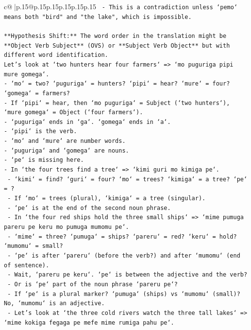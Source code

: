 \documentclass{article}
\begin{document}
{\begin{supertabular}{c@{$\;$}|p{.15\linewidth}@{}p{.15\linewidth}p{.15\linewidth}p{.15\linewidth}p{.15\linewidth}p{.15\linewidth}}
{{{\texttt{      {-} This is a contradiction unless `pemo` means both "bird" and "the lake", which is impossible.} \\
\\ 
\texttt{**Hypothesis Shift:** The word order in the translation might be **Object Verb Subject** (OVS) or **Subject Verb Object** but with different word identification.} \\
\texttt{Let's look at `two hunters hear four farmers` => `mo puguriga pipi mure gomega`.} \\
\texttt{{-} `mo` = two? `puguriga` = hunters? `pipi` = hear? `mure` = four? `gomega` = farmers?} \\
\texttt{{-} If `pipi` = hear, then `mo puguriga` = Subject (`two hunters`), `mure gomega` = Object (`four farmers`).} \\
\texttt{{-} `puguriga` ends in `ga`. `gomega` ends in `a`.} \\
\texttt{{-} `pipi` is the verb.} \\
\texttt{{-} `mo` and `mure` are number words.} \\
\texttt{{-} `puguriga` and `gomega` are nouns.} \\
\texttt{{-} `pe` is missing here.} \\
\texttt{{-} In `the four trees find a tree` => `kimi guri mo kimiga pe`.} \\
\texttt{  {-} `kimi` = find? `guri` = four? `mo` = trees? `kimiga` = a tree? `pe` = ?} \\
\texttt{  {-} If `mo` = trees (plural), `kimiga` = a tree (singular).} \\
\texttt{  {-} `pe` is at the end of the second noun phrase.} \\
\texttt{  {-} In `the four red ships hold the three small ships` => `mime pumuga pareru pe keru mo pumuga mumomu pe`.} \\
\texttt{    {-} `mime` = three? `pumuga` = ships? `pareru` = red? `keru` = hold? `mumomu` = small?} \\
\texttt{    {-} `pe` is after `pareru` (before the verb?) and after `mumomu` (end of sentence).} \\
\texttt{    {-} Wait, `pareru pe keru`. `pe` is between the adjective and the verb?} \\
\texttt{    {-} Or is `pe` part of the noun phrase `pareru pe`?} \\
\texttt{    {-} If `pe` is a plural marker? `pumuga` (ships) vs `mumomu` (small)? No, `mumomu` is an adjective.} \\
\texttt{    {-} Let's look at `the three cold rivers watch the three tall lakes` => `mime kokiga fegaga pe mefe mime rumiga pahu pe`.} \\
}}}
\end{supertabular}}
\end{document}
